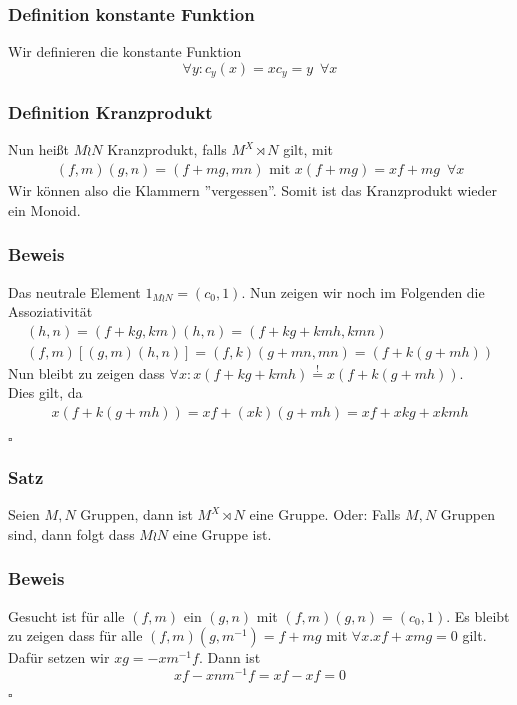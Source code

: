 \documentclass[12pt, german]{article}
\newcommand{\bewiesen}{

\begin{flushright}
		$\square$  \\
\end{flushright}}
\begin{document}
\subsubsection{Definition konstante Funktion}
	 Wir definieren die konstante Funktion	$$\forall y:  c_y(x) = xc_y = y \, \, \, \forall x$$ 

\subsubsection{Definition Kranzprodukt}
	Nun heißt $M \wr N$ Kranzprodukt, falls $M^X \rtimes N$ gilt, mit 
	\begin{align*}
		(f,m)(g,n) = (f + mg, mn) \text{ mit } x(f+mg) = xf + mg \, \, \, \forall x
	\end{align*}
	Wir können also die Klammern ''vergessen''. Somit ist das Kranzprodukt wieder ein Monoid.
	
	
\subsubsection{Beweis}
	Das neutrale Element $1_{M \wr N} = (c_0, 1)$.
	 Nun zeigen wir noch im Folgenden die Assoziativität
	 \begin{align*}
	 	[(f,m)(g,m)](h,n) = (f +kg, km)(h,n) = (f +kg + kmh, kmn) \\
	 	(f,m)[(g,m)(h,n)] = (f,k)(g +mn, mn) = (f + k ( g +mh)) 
	 \end{align*}
	 Nun bleibt zu zeigen dass $\forall x : x(f+kg + kmh) \overset{!}{=} x(f+k(g+mh))$. \\
	 Dies gilt, da 
	 	\begin{align*}
	 		x(f+k(g+mh)) = xf+(xk)(g + mh) = xf + xkg + xkmh
		 \end{align*}
	\bewiesen

\subsubsection{Satz}
	Seien $M, N$ Gruppen, dann ist $M^X \rtimes N$ eine Gruppe. Oder: Falls $M, N$ Gruppen sind, dann folgt dass  $M \wr N $ eine Gruppe ist.

\subsubsection{Beweis}
	Gesucht ist für alle $(f, m)$ ein $(g,n)$ mit $(f, m)(g,n) = (c_0, 1)$. Es bleibt zu zeigen dass für alle $(f,m)(g, m^{-1}) = f+mg$ mit $\forall x . xf + xmg = 0$ gilt. \\
	Dafür setzen wir $xg = -xm^{-1}f$. Dann ist $$xf-xnm^{-1}f = xf-xf = 0$$	\bewiesen
	
\end{document}
